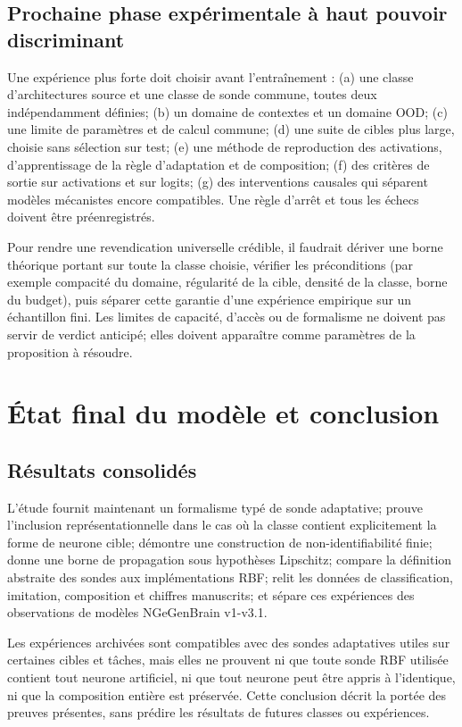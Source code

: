 \documentclass[11pt,a4paper,oneside]{report}
\begin{document}
\section{Prochaine phase expérimentale à haut pouvoir discriminant}
Une expérience plus forte doit choisir avant l'entraînement : (a) une classe d'architectures source et une classe de sonde commune, toutes deux indépendamment définies; (b) un domaine de contextes et un domaine OOD; (c) une limite de paramètres et de calcul commune; (d) une suite de cibles plus large, choisie sans sélection sur test; (e) une méthode de reproduction des activations, d'apprentissage de la règle d'adaptation et de composition; (f) des critères de sortie sur activations et sur logits; (g) des interventions causales qui séparent modèles mécanistes encore compatibles. Une règle d'arrêt et tous les échecs doivent être préenregistrés.

Pour rendre une revendication universelle crédible, il faudrait dériver une borne théorique portant sur toute la classe choisie, vérifier les préconditions (par exemple compacité du domaine, régularité de la cible, densité de la classe, borne du budget), puis séparer cette garantie d'une expérience empirique sur un échantillon fini. Les limites de capacité, d'accès ou de formalisme ne doivent pas servir de verdict anticipé; elles doivent apparaître comme paramètres de la proposition à résoudre.

\chapter{État final du modèle et conclusion}
\section{Résultats consolidés}
L'étude fournit maintenant un formalisme typé de sonde adaptative; prouve l'inclusion représentationnelle dans le cas où la classe contient explicitement la forme de neurone cible; démontre une construction de non-identifiabilité finie; donne une borne de propagation sous hypothèses Lipschitz; compare la définition abstraite des sondes aux implémentations RBF; relit les données de classification, imitation, composition et chiffres manuscrits; et sépare ces expériences des observations de modèles NGeGenBrain v1-v3.1.

Les expériences archivées sont compatibles avec des sondes adaptatives utiles sur certaines cibles et tâches, mais elles ne prouvent ni que toute sonde RBF utilisée contient tout neurone artificiel, ni que tout neurone peut être appris à l'identique, ni que la composition entière est préservée. Cette conclusion décrit la portée des preuves présentes, sans prédire les résultats de futures classes ou expériences.
\end{document}
